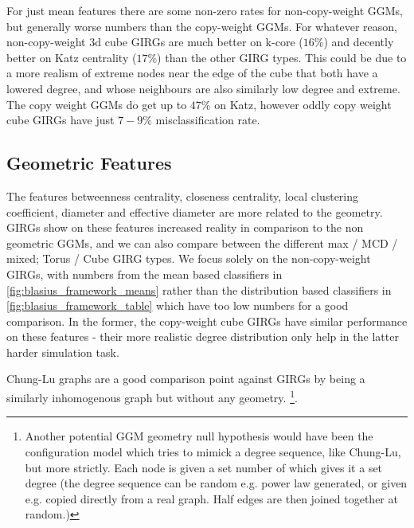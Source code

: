 For just mean features there are some non-zero rates for non-copy-weight GGMs, but generally worse numbers than the copy-weight GGMs. For whatever reason, non-copy-weight 3d cube GIRGs are much better on k-core ($16\%$) and decently better on Katz centrality ($17\%$) than the other GIRG types. This could be due to a more realism of extreme nodes near the edge of the cube that both have a lowered degree, and whose neighbours are also similarly low degree and extreme. The copy weight GGMs do get up to $47\%$ on Katz, however oddly copy weight cube GIRGs have just $7-9\%$ misclassification rate.

\subsection{Geometric Features}
The features betweenness centrality, closeness centrality, local clustering coefficient, diameter and effective diameter are more related to the geometry. GIRGs show on these features increased reality in comparison to the non geometric GGMs, and we can also compare between the different max / MCD / mixed; Torus / Cube GIRG types. We focus solely on the non-copy-weight GIRGs, with numbers from the mean based classifiers in \cref{fig:blasius_framework_means} rather than the distribution based classifiers in \cref{fig:blasius_framework_table} which have too low numbers for a good comparison. In the former, the copy-weight cube GIRGs have similar performance on these features - their more realistic degree distribution only help in the latter harder simulation task.


Chung-Lu graphs are a good comparison point against GIRGs by being a similarly inhomogenous graph but without any geometry.
\footnote{Another potential GGM geometry null hypothesis would have been the configuration model which tries to mimick a degree sequence, like Chung-Lu, but more strictly. Each node is given a set number of  which gives it a set degree (the degree sequence can be random e.g. power law generated, or given e.g. copied directly from a real graph. Half edges are then joined together at random.)}.



